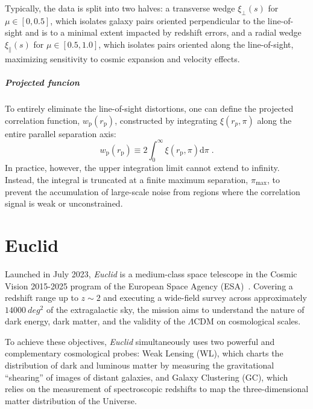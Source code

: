 \documentclass[12pt,a4paper,oneside]{report}
\begin{document}
Typically, the data is split into two halves: a transverse wedge $\xi_\perp(s)$ for $\mu \in [0, 0.5]$, which isolates galaxy pairs oriented perpendicular to the line-of-sight and is to a minimal extent impacted by redshift errors, and a radial wedge $\xi_\parallel(s)$ for $\mu \in [0.5, 1.0]$, which isolates pairs oriented along the line-of-sight, maximizing sensitivity to cosmic expansion and velocity effects.

\paragraph{Projected funcion}\label{parag:ProjectedFuncion}
To entirely eliminate the line-of-sight distortions, one can define the projected correlation function, $w_\mathrm{p}(r_\mathrm{p})$,  constructed by integrating $\xi(r_p, \pi)$ along the entire parallel separation axis:
\begin{equation}
  w_\mathrm{p}(r_\mathrm{p}) \equiv 2 \int_{0}^{\infty} \xi(r_\mathrm{p}, \pi) \mathrm{d} \pi \; .
  \label{eq:ProjectedFuncion}
\end{equation}
In practice, however, the upper integration limit cannot extend to infinity. Instead, the integral is truncated at a finite maximum separation, $\pi_\mathrm{max}$, to prevent the accumulation of large-scale noise from regions where the correlation signal is weak or unconstrained.


\chapter{Euclid}\label{chap:Euclid}
Launched in July 2023, \textit{Euclid} is a medium-class space telescope in the Cosmic Vision 2015-2025 program of the European Space Agency (ESA)~\cite{EuclidPaper}. Covering a redshift range up to $z \sim 2$ and executing a wide-field survey across approximately $\SI{14000}{deg^2}$ of the extragalactic sky, the mission aims to understand the nature of dark energy, dark matter, and the validity of the $\Lambda\mathrm{CDM}$ on cosmological scales.

To achieve these objectives, \textit{Euclid} simultaneously uses two powerful and complementary cosmological probes: Weak Lensing (WL), which charts the distribution of dark and luminous matter by measuring the gravitational “shearing” of images of distant galaxies, and Galaxy Clustering (GC), which relies on the measurement of spectroscopic redshifts to map the three-dimensional matter distribution of the Universe.
\end{document}
